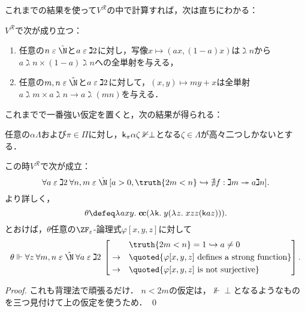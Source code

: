 \documentclass[realisability.tex]{subfiles}
\begin{document}
これまでの結果を使って$V^{\mathcal{R}}$の中で計算すれば，次は直ちにわかる：

\begin{lemma}\label{lem:ideal-factors}
 $V^{\mathcal{R}}$で次が成り立つ：
 \begin{enumerate}
  \item 任意の$n \strin \hat{\N}$と$a \mathrel{\varepsilon} \gimel2$に対し，写像$x \mapsto (ax, (1-a)x)$は$\gimel n$から$a\gimel n \times (1 - a) \gimel n$への全単射を与える，
  \item 任意の$m, n \strin \hat{\N}$と$a \mathrel{\varepsilon} \gimel 2$に対して，$(x, y) \mapsto my+x$は全単射$a \gimel m \times a \gimel n \to a \gimel (mn)$を与える．
 \end{enumerate}
\end{lemma}

これまでで一番強い仮定を置くと，次の結果が得られる：
\begin{lemma}\label{lem:2m<n=>m-/>>an}
 任意の$\alpha \Lambda$および$\pi \in \Pi$に対し，$\mathsf{k}_\pi \alpha \zeta \nVdash \perp$となる$\zeta \in \Lambda$が高々二つしかないとする．

 この時$V^{\mathcal{R}}$で次が成立：
 \[
  \forall a \strin \gimel 2 \: \forall n, m \strin \hat{\N}\:
 [a > 0, \truth{2m < n} \hookrightarrow \nexists f: \gimel m \twoheadrightarrow a \gimel n].
 \]
 より詳しく，
 \[
  \theta \defeq \abs{axy}{\cc(\abs{\conti}{y (\abs{z}{xzz(\conti a z)})})}.
 \]
 とおけば，$\theta $任意の$\ZFe$-論理式$\varphi[x, y, z]$に対して
 \[
  \theta \Vdash \forall z \: \forall m, n \strin \hat{\N}\: \forall a \strin \gimel2\:
 \left[
 \begin{aligned}
  &&&\truth{2m < n} = 1 \hookrightarrow a \neq 0\\
  &\to&&
  \quoted{\varphi[x,y,z] \text{ defines a strong function}}\\
  &\to &&\quoted{ \varphi[x,y,z] \text{ is not surjective}}
 \end{aligned}
\right].
 \]
\end{lemma}
\begin{proof}
 これも背理法で頑張るだけ．
 $n < 2m$の仮定は，$\nVdash \perp$となるようなものを三つ見付けて上の仮定を使うため． \qed
\end{proof}
\end{document}

